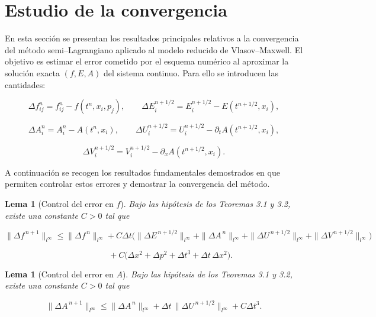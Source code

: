 \documentclass[11pt,a4paper,twoside,pdf]{article}
\numberwithin{equation}{section}
\newtheorem{lemma}[theorem]{Lema}
\begin{document}
\newpage
\section{Estudio de la convergencia}

En esta sección se presentan los resultados principales relativos a la convergencia del
método semi–Lagrangiano aplicado al modelo reducido de Vlasov–Maxwell. El
objetivo es estimar el error cometido por el esquema numérico al aproximar la
solución exacta $(f,E,A)$ del sistema continuo. Para ello se introducen las cantidades:


\[
\Delta f^n_{ij} = f^n_{ij} - f(t^n,x_i,p_j), \qquad
\Delta E^{n+1/2}_i = E^{n+1/2}_i - E(t^{n+1/2},x_i),
\]




\[
\Delta A^n_i = A^n_i - A(t^n,x_i), \qquad
\Delta U^{n+1/2}_i = U^{n+1/2}_i - \partial_t A(t^{n+1/2},x_i),
\]




\[
\Delta V^{n+1/2}_i = V^{n+1/2}_i - \partial_x A(t^{n+1/2},x_i).
\]



A continuación se recogen los resultados fundamentales demostrados en \cite{bostan2009convergence} que permiten controlar estos
errores y demostrar la convergencia del método.\\





\begin{lemma}[Control del error en $f$]
Bajo las hipótesis de los Teoremas 3.1 y 3.2, existe una constante $C>0$ tal que


\[
\|\Delta f^{\,n+1}\|_{l^\infty}
\le \|\Delta f^{\,n}\|_{l^\infty}
+ C\Delta t\big(
\|\Delta E^{\,n+1/2}\|_{l^\infty}
+ \|\Delta A^{\,n}\|_{l^\infty}
+ \|\Delta U^{\,n+1/2}\|_{l^\infty}
+ \|\Delta V^{\,n+1/2}\|_{l^\infty}
\big)
\]




\[
\qquad\qquad
+ C\big(\Delta x^2 + \Delta p^2 + \Delta t^3 + \Delta t\,\Delta x^2\big).
\]


\end{lemma}



\begin{lemma}[Control del error en $A$]
Bajo las hipótesis de los Teoremas 3.1 y 3.2, existe una constante $C>0$ tal que


\[
\|\Delta A^{\,n+1}\|_{l^\infty}
\le \|\Delta A^{\,n}\|_{l^\infty}
+ \Delta t\,\|\Delta U^{\,n+1/2}\|_{l^\infty}
+ C\Delta t^3.
\]


\end{lemma}
\end{document}

